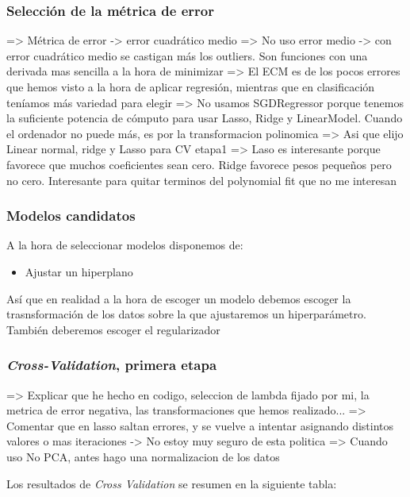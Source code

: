 \documentclass[11pt]{article}
\begin{document}
\subsubsection{Selección de la métrica de error}

=> Métrica de error -> error cuadrático medio
=> No uso error medio -> con error cuadrático medio se castigan más los outliers. Son funciones con una derivada mas sencilla a la hora de minimizar
=> El ECM es de los pocos errores que hemos visto a la hora de aplicar regresión, mientras que en clasificación teníamos más variedad para elegir
=> No usamos SGDRegressor porque tenemos la suficiente potencia de cómputo para usar Lasso, Ridge y LinearModel. Cuando el ordenador no puede más, es por la transformacion polinomica
=> Asi que elijo Linear normal, ridge y Lasso para CV etapa1
    => Laso es interesante porque favorece que muchos coeficientes sean cero. Ridge favorece pesos pequeños pero no cero. Interesante para quitar terminos del polynomial fit que no me interesan

\subsubsection{Modelos candidatos}

A la hora de seleccionar modelos disponemos de:

\begin{itemize}
    \item Ajustar un hiperplano
\end{itemize}

Así que en realidad a la hora de escoger un modelo debemos escoger la trasnsformación de los datos sobre la que ajustaremos un hiperparámetro. También deberemos escoger el regularizador

\subsubsection{\emph{Cross-Validation}, primera etapa}

=> Explicar que he hecho en codigo, seleccion de lambda fijado por mi, la metrica de error negativa, las transformaciones que hemos realizado...
=> Comentar que en lasso saltan errores, y se vuelve a intentar asignando distintos valores o mas iteraciones -> No estoy muy seguro de esta politica
=> Cuando uso No PCA, antes hago una normalizacion de los datos

Los resultados de \emph{Cross Validation} se resumen en la siguiente tabla:
\end{document}
